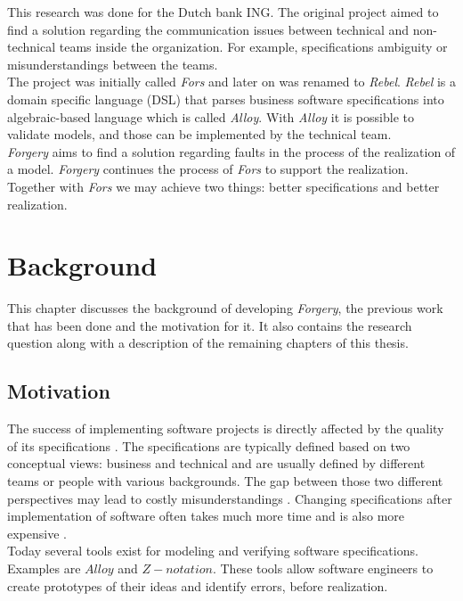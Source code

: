 \documentclass[oneside]{book}
\begin{document}
This research was done for the Dutch bank ING. The original project aimed to find a solution regarding the communication issues between technical and non-technical teams inside the organization. For example, specifications ambiguity or misunderstandings between the teams.\\

The project was initially called \textit{Fors} and later on was renamed to \textit{Rebel}. \textit{Rebel} is a domain specific language (DSL) that parses business software specifications into algebraic-based language which is called \textit{Alloy}. With \textit{Alloy} it is possible to validate models, and those can be implemented by the technical team.\\

\textit{Forgery} aims to find a solution regarding faults in the process of the realization of a model. \textit{Forgery} continues the process of \textit{Fors} to support the realization. Together with \textit{Fors} we may achieve two things: better specifications and better realization.\\

\newpage

\chapter{Background}
This chapter discusses the background of developing \textit{Forgery}, the previous work that has been done and the motivation for it. It also contains the research question along with a description of the remaining chapters of this thesis.

\section{Motivation}

The success of implementing software projects is directly affected by the quality of its specifications \cite[p.~12]{requirements}. The specifications are typically defined based on two conceptual views: business and technical and are usually defined by different teams or people with various backgrounds. The gap between those two different perspectives may lead to costly misunderstandings \cite[p.~1]{fors}. Changing specifications after implementation of software often takes much more time and is also more expensive \cite{defectstopten}.\\

Today several tools exist for modeling and verifying software specifications. Examples are $Alloy$ and $Z-notation$. These tools allow software engineers to create prototypes of their ideas and identify errors, before realization. \\
\end{document}
